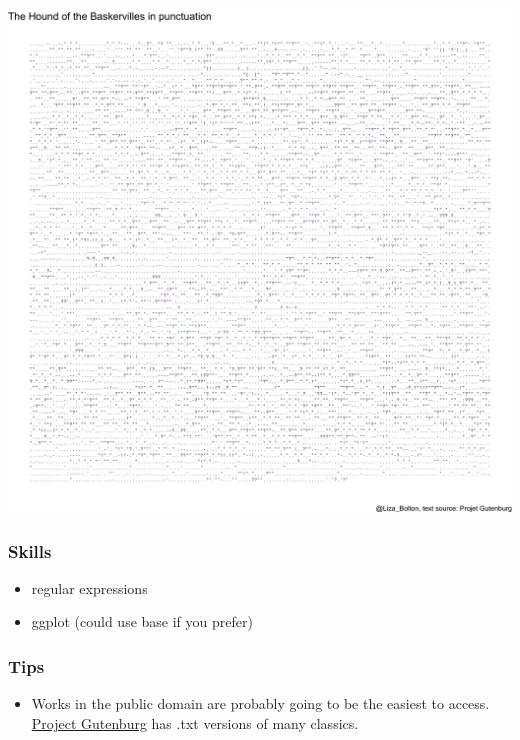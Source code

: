 \documentclass[
  openany]{book}
\providecommand{\tightlist}{%
  \setlength{\itemsep}{0pt}\setlength{\parskip}{0pt}}
\begin{document}
\begin{center}\includegraphics[width=1\linewidth]{images/assessments/hound_of_the_baskervilles} \end{center}

\hypertarget{skills}{%
\subsubsection{Skills}\label{skills}}

\begin{itemize}
\tightlist
\item
  regular expressions\\
\item
  ggplot (could use base if you prefer)
\end{itemize}

\hypertarget{tips}{%
\subsubsection{Tips}\label{tips}}

\begin{itemize}
\tightlist
\item
  Works in the public domain are probably going to be the easiest to access. \href{https://www.gutenberg.org/}{Project Gutenburg} has .txt versions of many classics.
\end{itemize}
\end{document}
